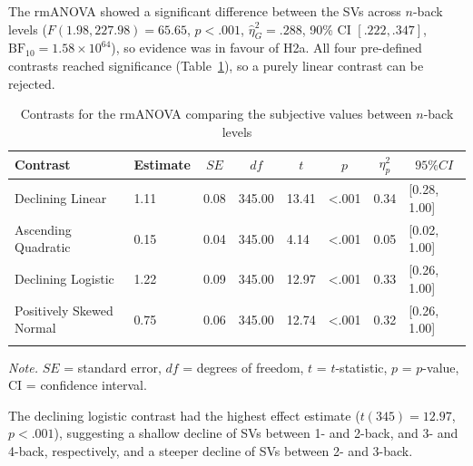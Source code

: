\documentclass[
  man,floatsintext]{apa6}
\begin{document}
The rmANOVA showed a significant difference between the SVs across \(n\)-back levels (\(F(1.98, 227.98) = 65.65\), \(p < .001\), \(\hat{\eta}^2_G = .288\), 90\% CI \([.222, .347]\), \(\mathrm{BF}_{\textrm{10}} = 1.58 \times 10^{64}\)), so evidence was in favour of H2a.
All four pre-defined contrasts reached significance (Table~\ref{tab:H2a-contrasts}), so a purely linear contrast can be rejected.

\begin{table}[H]

\begin{center}
\begin{threeparttable}

\caption{\label{tab:H2a-contrasts}Contrasts for the rmANOVA comparing the subjective values between $n$-back levels}

\begin{tabular}{llllllll}
\toprule
Contrast & \multicolumn{1}{c}{Estimate} & \multicolumn{1}{c}{$SE$} & \multicolumn{1}{c}{$df$} & \multicolumn{1}{c}{$t$} & \multicolumn{1}{c}{$p$} & \multicolumn{1}{c}{$\eta_{p}^{2}$} & \multicolumn{1}{c}{$95\% CI$}\\
\midrule
Declining Linear & 1.11 & 0.08 & 345.00 & 13.41 & <.001 & 0.34 & {}[0.28, 1.00]\\
Ascending Quadratic & 0.15 & 0.04 & 345.00 & 4.14 & <.001 & 0.05 & {}[0.02, 1.00]\\
Declining Logistic & 1.22 & 0.09 & 345.00 & 12.97 & <.001 & 0.33 & {}[0.26, 1.00]\\
Positively Skewed Normal & 0.75 & 0.06 & 345.00 & 12.74 & <.001 & 0.32 & {}[0.26, 1.00]\\
\bottomrule
\addlinespace
\end{tabular}

\begin{tablenotes}[para]
\normalsize{\textit{Note.} $SE$ = standard error, $df$ = degrees of freedom, $t$ = $t$-statistic, $p$ = $p$-value, CI = confidence interval.}
\end{tablenotes}

\end{threeparttable}
\end{center}

\end{table}

The declining logistic contrast had the highest effect estimate (\(t(345) = 12.97\), \(p < .001\)), suggesting a shallow decline of SVs between 1- and 2-back, and 3- and 4-back, respectively, and a steeper decline of SVs between 2- and 3-back.
\end{document}

